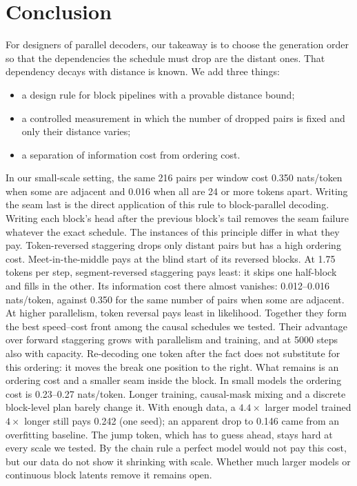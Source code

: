 \documentclass[11pt]{article}
\theoremstyle{definition}
\theoremstyle{remark}
\begin{document}
\section{Conclusion}

For designers of parallel decoders, our takeaway is to choose the generation order so that the dependencies the schedule must drop are the distant ones.
That dependency decays with distance is known.
We add three things:
\begin{itemize}
  \item a design rule for block pipelines with a provable distance bound;
  \item a controlled measurement in which the number of dropped pairs is fixed and only their distance varies;
  \item a separation of information cost from ordering cost.
\end{itemize}
In our small-scale setting, the same 216 pairs per window cost 0.350 nats/token when some are adjacent and 0.016 when all are 24 or more tokens apart.
Writing the seam last is the direct application of this rule to block-parallel decoding.
Writing each block's head after the previous block's tail removes the seam failure whatever the exact schedule.
The instances of this principle differ in what they pay.
Token-reversed staggering drops only distant pairs but has a high ordering cost.
Meet-in-the-middle pays at the blind start of its reversed blocks.
At 1.75 tokens per step, segment-reversed staggering pays least: it skips one half-block and fills in the other.
Its information cost there almost vanishes: 0.012--0.016 nats/token, against 0.350 for the same number of pairs when some are adjacent.
At higher parallelism, token reversal pays least in likelihood.
Together they form the best speed--cost front among the causal schedules we tested. Their advantage over forward staggering grows with parallelism and training, and at 5000 steps also with capacity.
Re-decoding one token after the fact does not substitute for this ordering: it moves the break one position to the right.
What remains is an ordering cost and a smaller seam inside the block.
In small models the ordering cost is 0.23--0.27 nats/token.
Longer training, causal-mask mixing and a discrete block-level plan barely change it.
With enough data, a $4.4\times$ larger model trained $4\times$ longer still pays 0.242 (one seed); an apparent drop to 0.146 came from an overfitting baseline.
The jump token, which has to guess ahead, stays hard at every scale we tested.
By the chain rule a perfect model would not pay this cost, but our data do not show it shrinking with scale.
Whether much larger models or continuous block latents remove it remains open.
\end{document}

